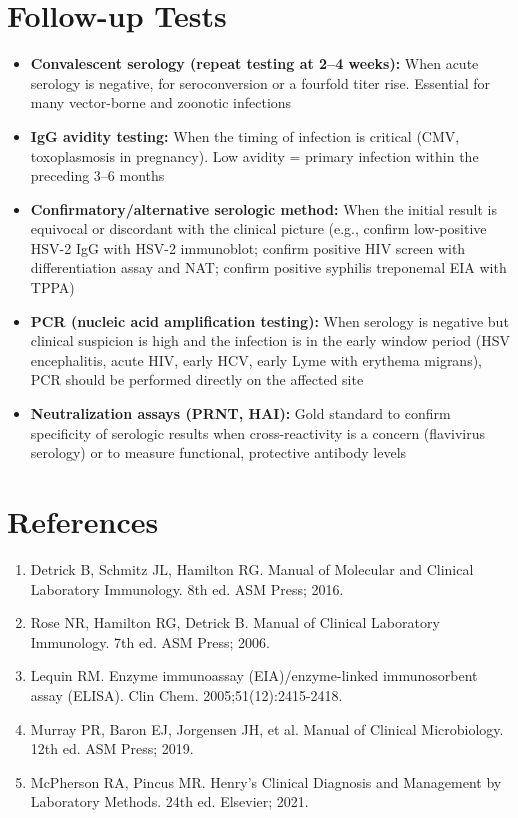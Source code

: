 \section*{Follow-up Tests}
\begin{itemize}
  \item \textbf{Convalescent serology (repeat testing at 2--4 weeks):} When acute serology is negative, for seroconversion or a fourfold titer rise. Essential for many vector-borne and zoonotic infections
  \item \textbf{IgG avidity testing:} When the timing of infection is critical (CMV, toxoplasmosis in pregnancy). Low avidity = primary infection within the preceding 3--6 months
  \item \textbf{Confirmatory/alternative serologic method:} When the initial result is equivocal or discordant with the clinical picture (e.g., confirm low-positive HSV-2 IgG with HSV-2 immunoblot; confirm positive HIV screen with differentiation assay and NAT; confirm positive syphilis treponemal EIA with TPPA)
  \item \textbf{PCR (nucleic acid amplification testing):} When serology is negative but clinical suspicion is high and the infection is in the early window period (HSV encephalitis, acute HIV, early HCV, early Lyme with erythema migrans), PCR should be performed directly on the affected site
  \item \textbf{Neutralization assays (PRNT, HAI):} Gold standard to confirm specificity of serologic results when cross-reactivity is a concern (flavivirus serology) or to measure functional, protective antibody levels
\end{itemize}

\section*{References}
\begin{enumerate}
  \item Detrick B, Schmitz JL, Hamilton RG. Manual of Molecular and Clinical Laboratory Immunology. 8th ed. ASM Press; 2016.
  \item Rose NR, Hamilton RG, Detrick B. Manual of Clinical Laboratory Immunology. 7th ed. ASM Press; 2006.
  \item Lequin RM. Enzyme immunoassay (EIA)/enzyme-linked immunosorbent assay (ELISA). Clin Chem. 2005;51(12):2415-2418.
  \item Murray PR, Baron EJ, Jorgensen JH, et al. Manual of Clinical Microbiology. 12th ed. ASM Press; 2019.
  \item McPherson RA, Pincus MR. Henry's Clinical Diagnosis and Management by Laboratory Methods. 24th ed. Elsevier; 2021.
\end{enumerate}

\clearpage
